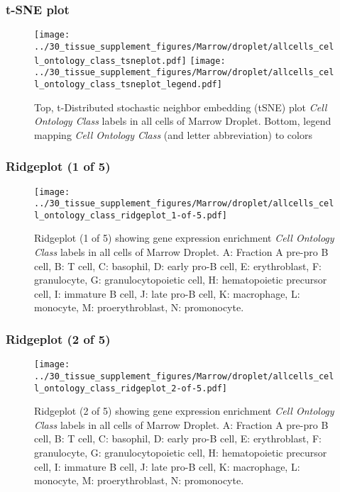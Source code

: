 \clearpage
\subsubsection{t-SNE plot}
\begin{figure}[h]
\centering
\texttt{[image: ../30\_tissue\_supplement\_figures/Marrow/droplet/allcells\_cell\_ontology\_class\_tsneplot.pdf]}
\texttt{[image: ../30\_tissue\_supplement\_figures/Marrow/droplet/allcells\_cell\_ontology\_class\_tsneplot\_legend.pdf]}
\caption{Top, t-Distributed stochastic neighbor embedding (tSNE) plot  \emph{Cell Ontology Class} labels in all cells of Marrow Droplet. Bottom, legend mapping \emph{Cell Ontology Class} (and letter abbreviation) to colors}
\end{figure}


\clearpage

\subsubsection{Ridgeplot (1 of 5)}
\begin{figure}[h]
\centering
\texttt{[image: ../30\_tissue\_supplement\_figures/Marrow/droplet/allcells\_cell\_ontology\_class\_ridgeplot\_1-of-5.pdf]}

\caption{ Ridgeplot (1 of 5)  showing gene expression enrichment \emph{Cell Ontology Class} labels in all cells of Marrow Droplet. A: Fraction A pre-pro B cell, B: T cell, C: basophil, D: early pro-B cell, E: erythroblast, F: granulocyte, G: granulocytopoietic cell, H: hematopoietic precursor cell, I: immature B cell, J: late pro-B cell, K: macrophage, L: monocyte, M: proerythroblast, N: promonocyte.}
\end{figure}


\clearpage

\subsubsection{Ridgeplot (2 of 5)}
\begin{figure}[h]
\centering
\texttt{[image: ../30\_tissue\_supplement\_figures/Marrow/droplet/allcells\_cell\_ontology\_class\_ridgeplot\_2-of-5.pdf]}

\caption{ Ridgeplot (2 of 5)  showing gene expression enrichment \emph{Cell Ontology Class} labels in all cells of Marrow Droplet. A: Fraction A pre-pro B cell, B: T cell, C: basophil, D: early pro-B cell, E: erythroblast, F: granulocyte, G: granulocytopoietic cell, H: hematopoietic precursor cell, I: immature B cell, J: late pro-B cell, K: macrophage, L: monocyte, M: proerythroblast, N: promonocyte.}
\end{figure}


